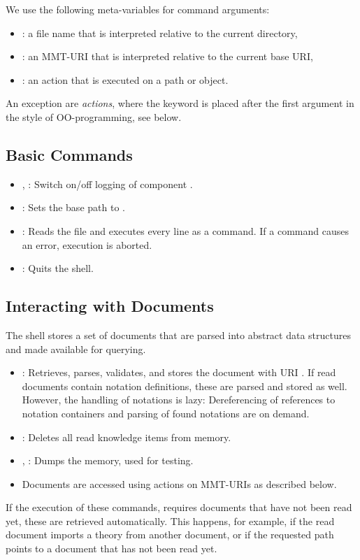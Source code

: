We use the following meta-variables for command arguments:
\begin{itemize}
	\item {}: a file name that is interpreted relative to the current directory,
	\item {}: an MMT-URI that is interpreted relative to the current base URI,
	\item {}: an action that is executed on a path or object.
\end{itemize}

An exception are \emph{actions}, where the keyword is placed after the first argument in the style of OO-programming, see below.

\subsection{Basic Commands}\label{sec:shell:basic}
\begin{itemize}
\item {},  : Switch on/off logging of component .
\item {}: Sets the base path to .
\item {}: Reads the file  and executes every line as a command. If a command causes an error, execution is aborted.
\item {}: Quits the shell.
\end{itemize}

\subsection{Interacting with Documents}\label{sec:shell:interact}
The shell stores a set of documents that are parsed into abstract data structures and made available for querying.

\begin{itemize}
\item {}: Retrieves, parses, validates, and stores the document with URI . If read documents contain notation definitions, these are parsed and stored as well. However, the handling of notations is lazy: Dereferencing of references to notation containers and parsing of found notations are on demand.
\item {}: Deletes all read knowledge items from memory.
\item {}, : Dumps the memory, used for testing.
\item Documents are accessed using actions on MMT-URIs as described below.
\end{itemize}
If the execution of these commands, requires documents that have not been read yet, these are retrieved automatically. This happens, for example, if the read document imports a theory from another document, or if the requested path points to a document that has not been read yet.

